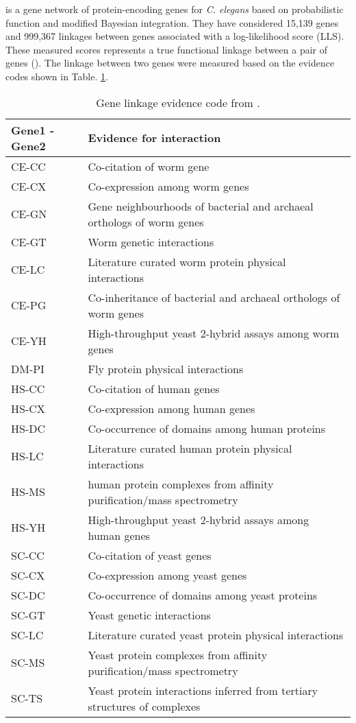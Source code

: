 \cite{WormNet} is a gene network of protein-encoding genes for \textit{C. elegans} based on probabilistic function and modified Bayesian integration. They have considered 15,139 genes and 999,367 linkages between genes associated with a log-likelihood score (LLS). These measured scores represents a true functional linkage between a pair of genes (\cite{Lee:2007}). The linkage between two genes were measured based on the evidence codes shown in Table. \ref{table:gene_linkage}.

\begin{table}[!htbp]
    {\renewcommand{\arraystretch}{1.5}
    \begin{tabularx}{0.99\textwidth}{ l X }
    \toprule
	\textbf{Gene1 - Gene2} & \textbf{Evidence for interaction}  \\
    \midrule
	CE-CC & Co-citation of worm gene \\
	CE-CX & Co-expression among worm genes \\
	CE-GN & Gene neighbourhoods of bacterial and archaeal orthologs of worm genes \\
	CE-GT & Worm genetic interactions \\
	CE-LC & Literature curated worm protein physical interactions \\
	CE-PG & Co-inheritance of bacterial and archaeal orthologs of worm genes \\
	CE-YH & High-throughput yeast 2-hybrid assays among worm genes \\
	DM-PI & Fly protein physical interactions \\
	HS-CC & Co-citation of human genes \\
	HS-CX & Co-expression among human genes \\
	HS-DC & Co-occurrence of domains among human proteins \\
	HS-LC & Literature curated human protein physical interactions \\
	HS-MS & human protein complexes from affinity purification/mass spectrometry \\
	HS-YH & High-throughput yeast 2-hybrid assays among human genes \\
	SC-CC & Co-citation of yeast genes \\
	SC-CX & Co-expression among yeast genes \\
	SC-DC & Co-occurrence of domains among yeast proteins \\
	SC-GT & Yeast genetic interactions \\
	SC-LC & Literature curated yeast protein physical interactions \\
	SC-MS & Yeast protein complexes from affinity purification/mass spectrometry \\
	SC-TS & Yeast protein interactions inferred from tertiary structures of complexes \\
    \bottomrule
    \end{tabularx}
	  \caption[Gene linkage evidence code]
	  {Gene linkage evidence code from \cite{WormNet}.
	  \label{table:gene_linkage}}}
\end{table}

